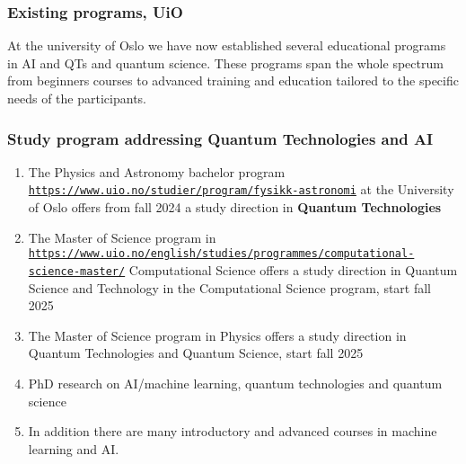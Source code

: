 \documentclass{beamer}
\begin{document}
\begin{frame}
\frametitle{Existing programs, UiO}

At the university of Oslo we have now established several educational
programs in AI and QTs and quantum science. These programs span the
whole spectrum from beginners courses to advanced training and
education tailored to the specific needs of the participants.
\end{frame}

\begin{frame}
\frametitle{Study program addressing Quantum Technologies and AI}

\begin{block}{}
\begin{enumerate}
\item The Physics and Astronomy bachelor program \href{{https://www.uio.no/studier/program/fysikk-astronomi}}{\nolinkurl{https://www.uio.no/studier/program/fysikk-astronomi}} at the University of Oslo offers from fall 2024 a study direction in \textbf{Quantum Technologies}

\item The Master of Science program in \href{{https://www.uio.no/english/studies/programmes/computational-science-master/}}{\nolinkurl{https://www.uio.no/english/studies/programmes/computational-science-master/}} Computational Science offers a study direction in Quantum Science and Technology in the Computational Science program, start fall 2025

\item The Master of Science program in Physics offers a study direction in Quantum Technologies and Quantum Science, start fall 2025

\item PhD research on AI/machine learning, quantum technologies and quantum science

\item In addition there are many introductory and advanced courses in machine learning and AI.
\end{enumerate}

\noindent
\end{block}
\end{frame}
\end{document}

